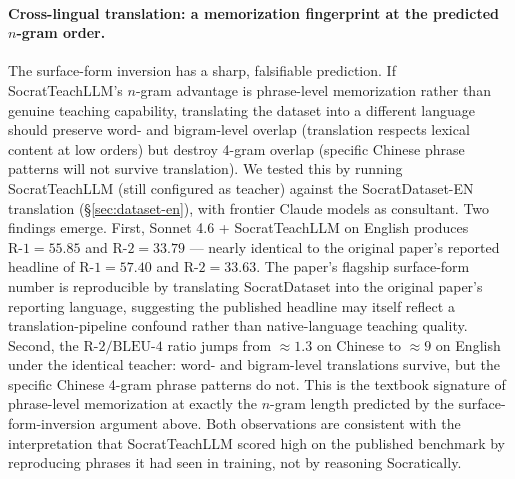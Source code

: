 \documentclass[11pt]{article}
\begin{document}
\paragraph{Cross-lingual translation: a memorization fingerprint at the predicted $n$-gram order.} The surface-form inversion has a sharp, falsifiable prediction. If SocratTeachLLM's $n$-gram advantage is phrase-level memorization rather than genuine teaching capability, translating the dataset into a different language should preserve word- and bigram-level overlap (translation respects lexical content at low orders) but destroy 4-gram overlap (specific Chinese phrase patterns will not survive translation). We tested this by running SocratTeachLLM (still configured as teacher) against the SocratDataset-EN translation (\S\ref{sec:dataset-en}), with frontier Claude models as consultant. Two findings emerge. First, Sonnet 4.6 + SocratTeachLLM on English produces $\text{R-1} = 55.85$ and $\text{R-2} = 33.79$ --- nearly identical to the original paper's reported headline of $\text{R-1} = 57.40$ and $\text{R-2} = 33.63$. The paper's flagship surface-form number is reproducible by translating SocratDataset into the original paper's reporting language, suggesting the published headline may itself reflect a translation-pipeline confound rather than native-language teaching quality. Second, the $\text{R-2}/\text{BLEU-4}$ ratio jumps from $\approx 1.3$ on Chinese to $\approx 9$ on English under the identical teacher: word- and bigram-level translations survive, but the specific Chinese 4-gram phrase patterns do not. This is the textbook signature of phrase-level memorization at exactly the $n$-gram length predicted by the surface-form-inversion argument above. Both observations are consistent with the interpretation that SocratTeachLLM scored high on the published benchmark by reproducing phrases it had seen in training, not by reasoning Socratically.
\end{document}
